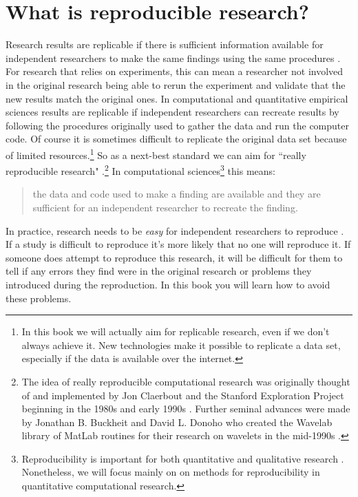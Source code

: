 \section{What is reproducible research?}

Research results are replicable if there is sufficient information available for independent researchers to make the same findings using the same procedures \cite[444]{King1995}. For research that relies on experiments, this can mean a researcher not involved in the original research being able to rerun the experiment and validate that the new results match the original ones. In computational and quantitative empirical sciences results are replicable if independent researchers can recreate results by following the procedures originally used to gather the data and run the computer code. Of course it is sometimes difficult to replicate the original data set because of limited resources.\footnote{In this book we will actually aim for replicable research, even if we don't always achieve it. New technologies make it possible to replicate a data set, especially if the data is available over the internet.} So as a next-best standard we can aim for ``really reproducible research" \cite[1226]{Peng2011}.\footnote{The idea of really reproducible computational research was originally thought of and implemented by Jon Claerbout and the Stanford Exploration Project beginning in the 1980s and early 1990s \cite[]{Fomel2009,Donoho2009}. Further seminal advances were made by Jonathan B. Buckheit and David L. Donoho who created the Wavelab library of MatLab routines for their research on wavelets in the mid-1990s \cite[]{Buckheit1995}.} In computational sciences\footnote{Reproducibility is important for both quantitative and qualitative research \cite[]{King1994}. Nonetheless, we will focus mainly on on methods for reproducibility in quantitative computational research.} this means:

\begin{quote}
    the data and code used to make a finding are available and they are sufficient for an independent researcher to recreate the finding.
\end{quote} 

In practice, research needs to be {\emph{easy}} for independent researchers to reproduce \cite[]{Ball2012}. If a study is difficult to reproduce it's more likely that no one will reproduce it. If someone does attempt to reproduce this research, it will be difficult for them to tell if any errors they find were in the original research or problems they introduced during the reproduction. In this book you will learn how to avoid these problems. 

